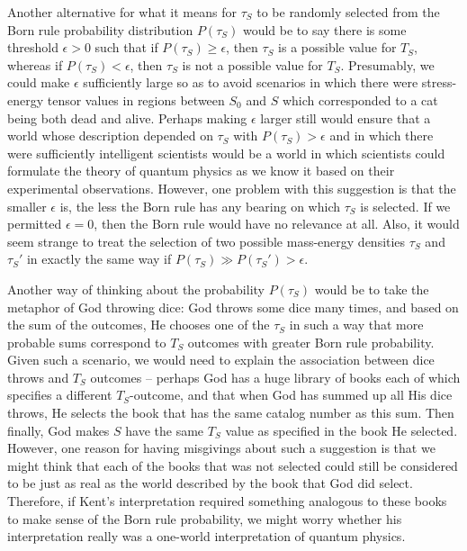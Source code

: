 Another alternative for what it means for $\tau_S$ to be randomly selected from the Born rule probability distribution $P(\tau_S)$ would be to say there is some threshold $\epsilon>0$ such that if $P(\tau_S)\geq\epsilon$, then $\tau_S$ is a possible value for $T_S$, whereas if $P(\tau_S)<\epsilon$, then  $\tau_S$ is not a possible value for $T_S$. Presumably, we could make $\epsilon$ sufficiently large so as to avoid scenarios in which there were stress-energy tensor values in regions between  $S_0$ and $S$ which corresponded to a cat being both dead and alive. Perhaps making $\epsilon$ larger still would ensure that a world whose description depended on $\tau_S$ with  $P(\tau_S)>\epsilon$ and in which there were sufficiently intelligent scientists would be a world in which scientists could formulate the theory of quantum physics as we know it based on their experimental observations. However, one problem with this suggestion is that the smaller $\epsilon$ is, the less the Born rule has any bearing on which $\tau_S$ is selected. If we permitted $\epsilon=0$, then the Born rule would have no relevance at all. Also, it would seem strange to treat the selection of two possible mass-energy densities $\tau_S$ and $\tau_S'$ in exactly the same way if $P(\tau_S)\gg P(\tau_S')>\epsilon$. 

Another way of thinking about the probability $P(\tau_S)$ would be to take the metaphor of God throwing dice: God throws some dice many times, and based on the sum of the outcomes, He chooses one of the $\tau_S$ in such a way that more probable sums correspond to $T_S$ outcomes with greater Born rule probability. Given such a scenario, we would need to explain the association between dice throws and $T_S$ outcomes -- perhaps God has a huge library of books each of which specifies a different $T_S$-outcome, and that when God  has summed up all His dice throws, He selects the book that has the same catalog number as this sum. Then finally, God makes $S$ have the same $T_S$ value as specified in the book He selected. However, one reason for having misgivings about such a suggestion is that we might think that each of the books that was not selected could still be considered to be just as real as the world described by the book that God did select. Therefore, if Kent's interpretation required something analogous to these books to make sense of the Born rule probability, we might worry whether his interpretation  really was a one-world interpretation of quantum physics. 

